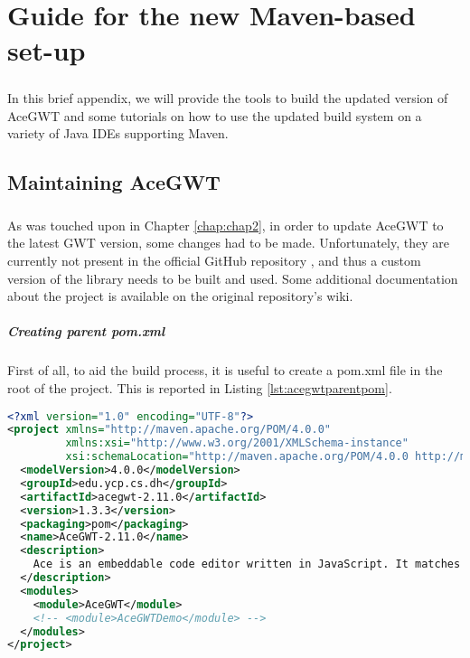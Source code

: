 \chapter{Guide for the new Maven-based set-up}\label{chap:appB}
\paragraph{}
In this brief appendix, we will provide the tools to build the updated version of AceGWT and some tutorials on how to use the updated build system on a variety of Java IDEs supporting Maven.
\section{Maintaining AceGWT}
\paragraph{}
As was touched upon in Chapter \ref{chap:chap2}, in order to update AceGWT to the latest GWT version, some changes had to be made. Unfortunately, they are currently not present in the official GitHub repository \cite{web:acegwtgit}, and thus a custom version of the library needs to be built and used. Some additional documentation about the project is available on the original repository's wiki.
\paragraph{Creating parent pom.xml}
First of all, to aid the build process, it is useful to create a pom.xml file in the root of the project. This is reported in Listing \ref{lst:acegwtparentpom}.
\begin{lstlisting}[float, language=XML, label={lst:acegwtparentpom}, caption={The new parent pom.xml}]
<?xml version="1.0" encoding="UTF-8"?>
<project xmlns="http://maven.apache.org/POM/4.0.0"
         xmlns:xsi="http://www.w3.org/2001/XMLSchema-instance"
         xsi:schemaLocation="http://maven.apache.org/POM/4.0.0 http://maven.apache.org/xsd/maven-4.0.0.xsd">
  <modelVersion>4.0.0</modelVersion>
  <groupId>edu.ycp.cs.dh</groupId>
  <artifactId>acegwt-2.11.0</artifactId>
  <version>1.3.3</version>
  <packaging>pom</packaging>
  <name>AceGWT-2.11.0</name>
  <description>
    Ace is an embeddable code editor written in JavaScript. It matches the features and performance of native editors such as Sublime, Vim and TextMate. It can be easily embedded in any web page and JavaScript application. Ace is maintained as the primary editor for Cloud9 IDE and is the successor of the Mozilla Skywriter (Bespin) project. AceGWT is an integration of Ace into GWT.
  </description>
  <modules>
    <module>AceGWT</module>
    <!-- <module>AceGWTDemo</module> -->
  </modules>
</project>
\end{lstlisting}
